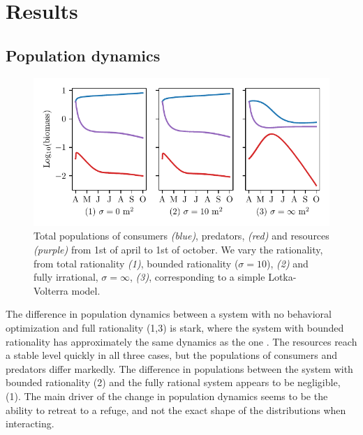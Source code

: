 \section{Results}

\subsection*{Population dynamics}
\begin{figure}[H]
\includegraphics{plots/populations.pdf}
\caption{Total populations of consumers \emph{(blue)}, predators, \emph{(red)} and resources \emph{(purple)} from 1st of april to 1st of october. We vary the rationality, from total rationality \emph{(1)}, bounded rationality ($\sigma = 10$), \emph{(2)} and fully irrational, $\sigma = \infty$, \emph{(3)}, corresponding to a simple Lotka-Volterra model.}
\label{fig:long_term_populations}


\end{figure}
The difference in population dynamics between a system with no behavioral optimization and full rationality (1,3) is stark, where the system with bounded rationality has approximately the same dynamics as the one . The resources reach a stable level quickly in all three cases, but the populations of consumers and predators differ markedly. The difference in populations between the system with bounded rationality (2) and the fully rational system appears to be negligible, (1). The main driver of the change in population dynamics seems to be the ability to retreat to a refuge, and not the exact shape of the distributions when interacting.

